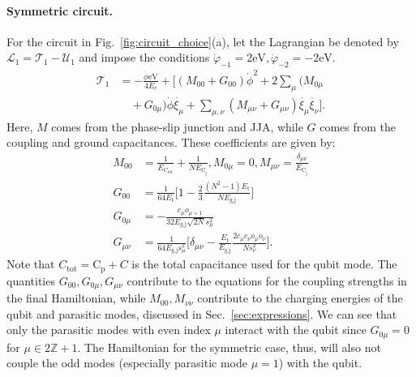 \documentclass[%
reprint,
superscriptaddress,
 amsmath,amssymb,
 aps,
 prx,
longbibliography,
floatfix,
]{revtex4-2}
\begin{document}
\paragraph{Symmetric circuit.} For the circuit in Fig.~\ref{fig:circuit_choice}(a), let the Lagrangian be denoted by $\mathcal{L}_1=\mathcal{T}_1-\mathcal{U}_1$ and impose the conditions $\dot{\varphi}_{-1}=2\textrm{eV}, \dot{\varphi}_{-2}=-2\textrm{eV}$.
\begin{align}
\mathcal{T}_1&=-\frac{\dot{\phi}\textrm{eV}}{4E_{\textrm{c}}}+\Big[(M_{00}+G_{00})\dot{\phi}^2+2\sum_{\mu}(M_{0\mu}\nonumber\\&\quad+G_{0\mu})\dot{\phi}\dot{\xi_\mu}+\sum_{\mu,\nu}(M_{\mu\nu}+G_{\mu\nu})\dot{\xi_\mu}\dot{\xi_\nu}\Big].\end{align}
Here, $M$ comes from the phase-slip junction and JJA, while $G$ comes from the coupling and ground capacitances. These coefficients are given by:
\begin{align}
M_{00}&=\frac{1}{E_{C_\textrm{tot}}}+\frac{1}{NE_{\textrm{C}_\textrm{j}}}, M_{0\mu}=0,    M_{\mu\nu}=\frac{\delta_{\mu\nu}}{E_{\textrm{C}_\textrm{j}}}\\
G_{00}&=\frac{1}{64E_{\textrm{t}}}\Big[1-\frac{2}{3}\frac{(N^2-1)E_\textrm{t}}{NE_\textrm{g,j}}\Big]\\
G_{0\mu}&=-\frac{c_\mu o_{\mu+1}}{32E_{\textrm{g,j}}\sqrt{2N}s_\mu^2}\\
G_{\mu\nu}&=\frac{1}{64E_{\textrm{g,j}}s_\mu^2}\Big[\delta_{\mu\nu}-\frac{E_{\textrm{t}}}{E_{\textrm{g,j}}}\frac{2c_\mu c_\nu o_\mu o_\nu}{N s_\nu^2}\Big].
\end{align}
Note that $C_\textrm{tot}=\textrm{C}_\textrm{p}+C$ is the total capacitance used for the qubit mode. The quantities $G_{00}, G_{0\mu}, G_{\mu\nu}$ contribute to the equations for the coupling strengths in the final Hamiltonian, while $M_{00}, M_{\nu\nu}$ contribute to the charging energies of the qubit and parasitic modes, discussed in Sec.~\ref{sec:expressions}. We can see that only the parasitic modes with even index $\mu$ interact with the qubit since $G_{0\mu}=0$ for $\mu\in 2\mathbb{Z}+1$. The Hamiltonian for the symmetric case, thus, will also not couple the odd modes (especially parasitic mode $\mu=1$) with the qubit.
\end{document}
